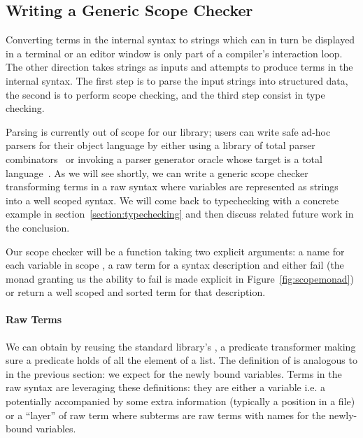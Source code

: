 \subsection{Writing a Generic Scope Checker}\label{section:genericscoping}

Converting terms in the internal syntax to strings which can in turn be
displayed in a terminal or an editor window is only part of a compiler's
interaction loop. The other direction takes strings as inputs and attempts to
produce terms in the internal syntax. The first step is to parse the input
strings into structured data, the second is to perform scope checking,
and the third step consist in type checking.

Parsing is currently out of scope for our library; users can write safe
ad-hoc parsers for their object language by either using a library of total
parser combinators~\cite{DBLP:conf/icfp/Danielsson10,allais2018agdarsec}
or invoking a parser generator oracle whose target is a total
language~\cite{Stump:2016:VFP:2841316}. As we will see shortly, we can
write a generic scope checker transforming terms in a raw syntax where
variables are represented as strings into a well scoped syntax. We will
come back to typechecking with a concrete example in section~\ref{section:typechecking}
and then discuss related future work in the conclusion.

Our scope checker will be a function taking two explicit arguments: a name for
each variable in scope , a raw term for a syntax description  and
either fail (the monad  granting us the ability to fail is made explicit
in Figure~\ref{fig:scopemonad}) or return a well scoped and sorted term for
that description.


\paragraph{Raw Terms} We can obtain  by reusing the standard library's
, a predicate transformer making sure a predicate holds of all the element
of a list. The definition of  is analogous to  in the
previous section: we expect  for the newly bound variables.
Terms in the raw syntax are leveraging these definitions: they are either a variable
i.e. a  potentially accompanied by some extra information  (typically
a position in a file) or a ``layer'' of raw term where subterms are raw terms with
names for the newly-bound variables.

